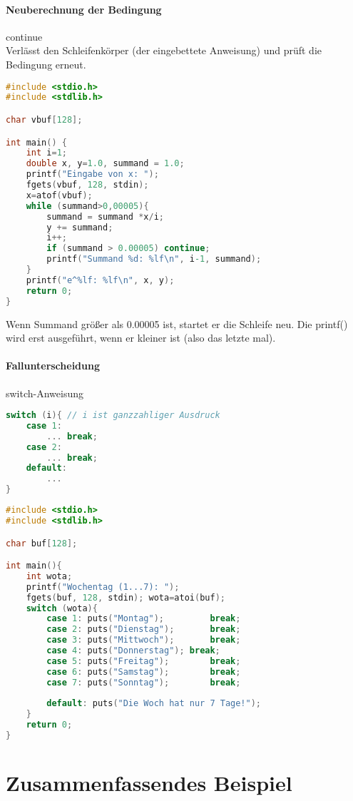 \paragraph{Neuberechnung der Bedingung} continue\\
Verlässt den Schleifenkörper (der eingebettete Anweisung) und prüft die Bedingung erneut.
\begin{lstlisting}[language=C]
#include <stdio.h>
#include <stdlib.h>

char vbuf[128];

int main() {
	int i=1;
	double x, y=1.0, summand = 1.0;
	printf("Eingabe von x: ");
	fgets(vbuf, 128, stdin);
	x=atof(vbuf);
	while (summand>0,00005){
		summand = summand *x/i;
		y += summand;		
		i++;
		if (summand > 0.00005) continue;
		printf("Summand %d: %lf\n", i-1, summand);
	}
	printf("e^%lf: %lf\n", x, y);
	return 0;
}
\end{lstlisting}
Wenn Summand größer als 0.00005 ist, startet er die Schleife neu. Die printf() wird erst ausgeführt, wenn er kleiner ist (also das letzte mal).

\paragraph{Fallunterscheidung} switch-Anweisung
\begin{lstlisting}[language=C]
switch (i){ // i ist ganzzahliger Ausdruck
	case 1:
		... break;
	case 2:
		... break;
	default:
		...
}
\end{lstlisting}
\begin{lstlisting}[language=C]
#include <stdio.h>
#include <stdlib.h>

char buf[128];

int main(){
	int wota;
	printf("Wochentag (1...7): ");
	fgets(buf, 128, stdin); wota=atoi(buf);
	switch (wota){
		case 1: puts("Montag");			break;
		case 2: puts("Dienstag");		break;
		case 3: puts("Mittwoch");		break;
		case 4: puts("Donnerstag");	break;
		case 5: puts("Freitag");		break;
		case 6: puts("Samstag");		break;
		case 7: puts("Sonntag");		break;
		
		default: puts("Die Woch hat nur 7 Tage!");
	}
	return 0;
}
\end{lstlisting}

\section{Zusammenfassendes Beispiel}

